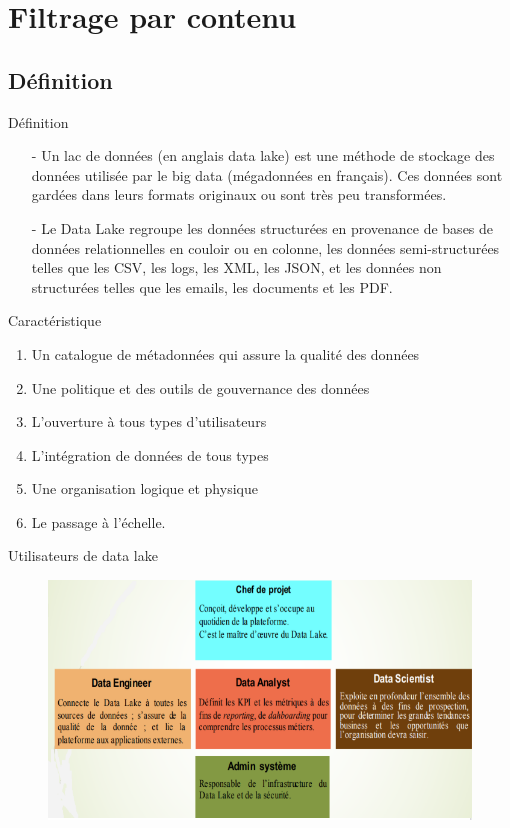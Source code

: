 \section[Filtrage par contenu]{Filtrage par contenu}
\subsection{Définition}
\begin{frame}{Définition}
    \begin{itemize}\itemsep1em
        \item[-] Un lac de données (en anglais data lake) est une méthode de stockage des données utilisée par le big data (mégadonnées en français). Ces données sont gardées dans leurs formats originaux ou sont très peu transformées.
        \item[-] Le Data Lake regroupe les données structurées en provenance de bases de données relationnelles en couloir ou en colonne, les données semi-structurées telles que les CSV, les logs, les XML, les JSON, et les données non structurées telles que les emails, les documents et les PDF.
    \end{itemize}
\end{frame}
\begin{frame}{Caractéristique}
    \begin{enumerate}
        \item Un catalogue de métadonnées qui assure la qualité des données
        \item Une politique et des outils de gouvernance  des données
        \item L’ouverture à tous types d'utilisateurs 
        \item L’intégration de données de tous types
        \item Une organisation logique et physique
        \item Le passage à l'échelle.
    \end{enumerate}
\end{frame}

\begin{frame}{Utilisateurs de data lake}
    \begin{figure}
        \centering
        \includegraphics[scale=0.6]{figures/users.PNG}
    \end{figure}
\end{frame}

